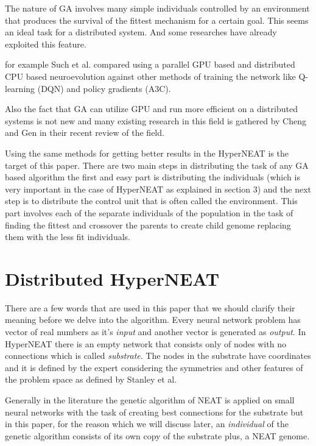 \documentclass[twocolumn]{article}
\begin{document}
The nature of GA involves many simple individuals controlled by an environment that produces the survival of the fittest mechanism for a certain goal. This seems an ideal task for a distributed system. And some researches have already exploited this feature.

for example Such et al. compared using a parallel GPU based and distributed CPU based neuroevolution against other methods of training the network like Q-learning (DQN) and policy gradients (A3C). \cite{GA-GPU-Comparison}

Also the fact that GA can utilize GPU and run more efficient on a distributed systems is not new and many existing research in this field is gathered by Cheng and Gen in their recent review of the field. \cite{GA-GPU-Review}

Using the same methods for getting better results in the HyperNEAT is the target of this paper. There are two main steps in distributing the task of any GA based algorithm the first and easy part is distributing the individuals (which is very important in the case of HyperNEAT as explained in section 3) and the next step is to distribute the control unit that is often called the environment. This part involves each of the separate individuals of the population in the task of finding the fittest and crossover the parents to create child genome replacing them with the less fit individuals.


\section{Distributed HyperNEAT}
\label{section:main}
There are a few words that are used in this paper that we should clarify their meaning before we delve into the algorithm. Every neural network problem has vector of real numbers as it's \textit{input} and another vector is generated as \textit{output}. In HyperNEAT there is an empty network that consists only of nodes with no connections which is called \textit{substrate}. The nodes in the substrate have coordinates and it is defined by the expert considering the symmetries and other features of the problem space as defined by Stanley et al. \cite{originalHyperNEAT}

Generally in the literature the genetic algorithm of NEAT is applied on small neural networks with the task of creating best connections for the substrate but in this paper, for the reason which we will discuss later, an \textit{individual} of the genetic algorithm consists of its own copy of the substrate plus, a NEAT genome.
\end{document}
